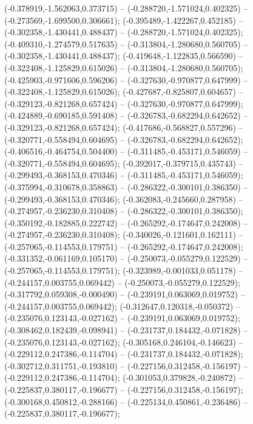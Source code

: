  (-0.378919,-1.562063,0.373715) -- (-0.288720,-1.571024,0.402325) -- (-0.273569,-1.699500,0.306661);
 (-0.395489,-1.422267,0.452185) -- (-0.302358,-1.430441,0.488437) -- (-0.288720,-1.571024,0.402325);
 (-0.409310,-1.274579,0.517635) -- (-0.313804,-1.280680,0.560705) -- (-0.302358,-1.430441,0.488437);
 (-0.419648,-1.122835,0.566590) -- (-0.322408,-1.125829,0.615026) -- (-0.313804,-1.280680,0.560705);
 (-0.425903,-0.971606,0.596206) -- (-0.327630,-0.970877,0.647999) -- (-0.322408,-1.125829,0.615026);
 (-0.427687,-0.825807,0.604657) -- (-0.329123,-0.821268,0.657424) -- (-0.327630,-0.970877,0.647999);
 (-0.424889,-0.690185,0.591408) -- (-0.326783,-0.682294,0.642652) -- (-0.329123,-0.821268,0.657424);
 (-0.417686,-0.568827,0.557296) -- (-0.320771,-0.558494,0.604695) -- (-0.326783,-0.682294,0.642652);
 (-0.406516,-0.464754,0.504400) -- (-0.311485,-0.453171,0.546059) -- (-0.320771,-0.558494,0.604695);
 (-0.392017,-0.379715,0.435743) -- (-0.299493,-0.368153,0.470346) -- (-0.311485,-0.453171,0.546059);
 (-0.375994,-0.310678,0.358863) -- (-0.286322,-0.300101,0.386350) -- (-0.299493,-0.368153,0.470346);
 (-0.362083,-0.245660,0.287958) -- (-0.274957,-0.236230,0.310408) -- (-0.286322,-0.300101,0.386350);
 (-0.350192,-0.182885,0.222742) -- (-0.265292,-0.174647,0.242008) -- (-0.274957,-0.236230,0.310408);
 (-0.340026,-0.121601,0.162111) -- (-0.257065,-0.114553,0.179751) -- (-0.265292,-0.174647,0.242008);
 (-0.331352,-0.061169,0.105170) -- (-0.250073,-0.055279,0.122529) -- (-0.257065,-0.114553,0.179751);
 (-0.323989,-0.001033,0.051178) -- (-0.244157,0.003755,0.069442) -- (-0.250073,-0.055279,0.122529);
 (-0.317792,0.059308,-0.000490) -- (-0.239191,0.063069,0.019752) -- (-0.244157,0.003755,0.069442);
 (-0.312647,0.120318,-0.050372) -- (-0.235076,0.123143,-0.027162) -- (-0.239191,0.063069,0.019752);
 (-0.308462,0.182439,-0.098941) -- (-0.231737,0.184432,-0.071828) -- (-0.235076,0.123143,-0.027162);
 (-0.305168,0.246104,-0.146623) -- (-0.229112,0.247386,-0.114704) -- (-0.231737,0.184432,-0.071828);
 (-0.302712,0.311751,-0.193810) -- (-0.227156,0.312458,-0.156197) -- (-0.229112,0.247386,-0.114704);
 (-0.301053,0.379828,-0.240872) -- (-0.225837,0.380117,-0.196677) -- (-0.227156,0.312458,-0.156197);
 (-0.300168,0.450812,-0.288166) -- (-0.225134,0.450861,-0.236486) -- (-0.225837,0.380117,-0.196677);
